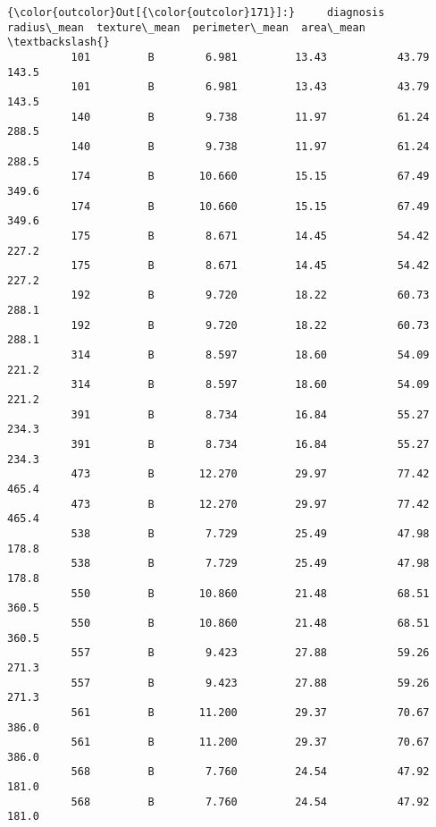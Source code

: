 \documentclass[11pt]{article}
\begin{document}
\begin{Verbatim}[commandchars=\\\{\}]
{\color{outcolor}Out[{\color{outcolor}171}]:}     diagnosis  radius\_mean  texture\_mean  perimeter\_mean  area\_mean  \textbackslash{}
          101         B        6.981         13.43           43.79      143.5   
          101         B        6.981         13.43           43.79      143.5   
          140         B        9.738         11.97           61.24      288.5   
          140         B        9.738         11.97           61.24      288.5   
          174         B       10.660         15.15           67.49      349.6   
          174         B       10.660         15.15           67.49      349.6   
          175         B        8.671         14.45           54.42      227.2   
          175         B        8.671         14.45           54.42      227.2   
          192         B        9.720         18.22           60.73      288.1   
          192         B        9.720         18.22           60.73      288.1   
          314         B        8.597         18.60           54.09      221.2   
          314         B        8.597         18.60           54.09      221.2   
          391         B        8.734         16.84           55.27      234.3   
          391         B        8.734         16.84           55.27      234.3   
          473         B       12.270         29.97           77.42      465.4   
          473         B       12.270         29.97           77.42      465.4   
          538         B        7.729         25.49           47.98      178.8   
          538         B        7.729         25.49           47.98      178.8   
          550         B       10.860         21.48           68.51      360.5   
          550         B       10.860         21.48           68.51      360.5   
          557         B        9.423         27.88           59.26      271.3   
          557         B        9.423         27.88           59.26      271.3   
          561         B       11.200         29.37           70.67      386.0   
          561         B       11.200         29.37           70.67      386.0   
          568         B        7.760         24.54           47.92      181.0   
          568         B        7.760         24.54           47.92      181.0   
          

\end{Verbatim}
\end{document}

